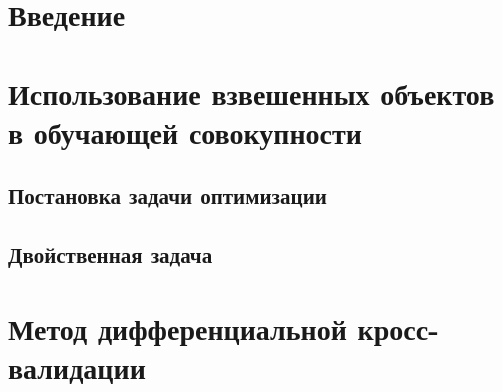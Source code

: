 \documentclass[12pt]{article}
\begin{document}
	
	\newpage \tableofcontents
	\newpage 
	\newpage 

	\section{Введение} 
		
	\section{Использование взвешенных объектов в обучающей совокупности}
		\subsection{Постановка задачи оптимизации} 	
		\subsection{Двойственная задача}			
	\section{Метод дифференциальной кросс-валидации}
		
		
		
\end{document}
